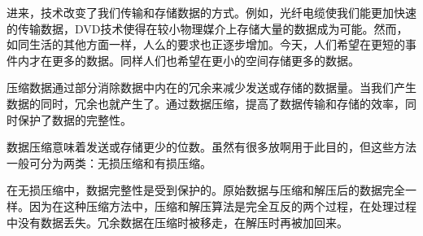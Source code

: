 
进来，技术改变了我们传输和存储数据的方式。例如，光纤电缆使我们能更加快速的传输数据，DVD技术使得在较小物理媒介上存储大量的数据成为可能。然而，如同生活的其他方面一样，人么的要求也正逐步增加。今天，人们希望在更短的事件内才在更多的数据。同样人们也希望在更小的空间存储更多的数据。 \par
压缩数据通过部分消除数据中内在的冗余来减少发送或存储的数据量。当我们产生数据的同时，冗余也就产生了。通过数据压缩，提高了数据传输和存储的效率，同时保护了数据的完整性。 \par
数据压缩意味着发送或存储更少的位数。虽然有很多放啊用于此目的，但这些方法一般可分为两类：无损压缩和有损压缩。 \par
在无损压缩中，数据完整性是受到保护的。原始数据与压缩和解压后的数据完全一样。因为在这种压缩方法中，压缩和解压算法是完全互反的两个过程，在处理过程中没有数据丢失。冗余数据在压缩时被移走，在解压时再被加回来。
